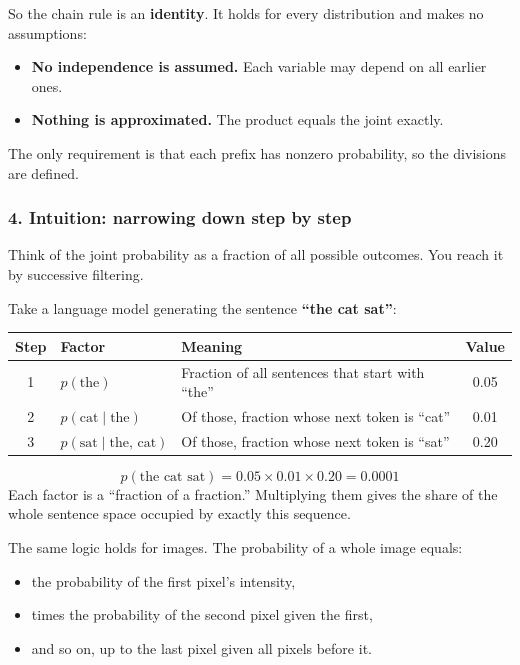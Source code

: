 So the chain rule is an \textbf{identity}. It holds for every distribution and makes no assumptions:
\begin{itemize}
  \item \textbf{No independence is assumed.} Each variable may depend on all earlier ones.
  \item \textbf{Nothing is approximated.} The product equals the joint exactly.
\end{itemize}
The only requirement is that each prefix has nonzero probability, so the divisions are defined.

\subsubsection*{4. Intuition: narrowing down step by step}

Think of the joint probability as a fraction of all possible outcomes. You reach it by successive filtering.

Take a language model generating the sentence \textbf{``the cat sat''}:

\begin{center}
\begin{tabular}{c l p{8cm} c}
\toprule
Step & Factor & Meaning & Value \\
\midrule
1 & $p(\text{the})$ & Fraction of all sentences that start with ``the'' & 0.05 \\
2 & $p(\text{cat} \mid \text{the})$ & Of those, fraction whose next token is ``cat'' & 0.01 \\
3 & $p(\text{sat} \mid \text{the, cat})$ & Of those, fraction whose next token is ``sat'' & 0.20 \\
\bottomrule
\end{tabular}
\end{center}

\[
p(\text{the cat sat}) = 0.05 \times 0.01 \times 0.20 = 0.0001
\]
Each factor is a ``fraction of a fraction.'' Multiplying them gives the share of the whole sentence space occupied by exactly this sequence.

The same logic holds for images. The probability of a whole image equals:
\begin{itemize}
  \item the probability of the first pixel's intensity,
  \item times the probability of the second pixel given the first,
  \item and so on, up to the last pixel given all pixels before it.
\end{itemize}

